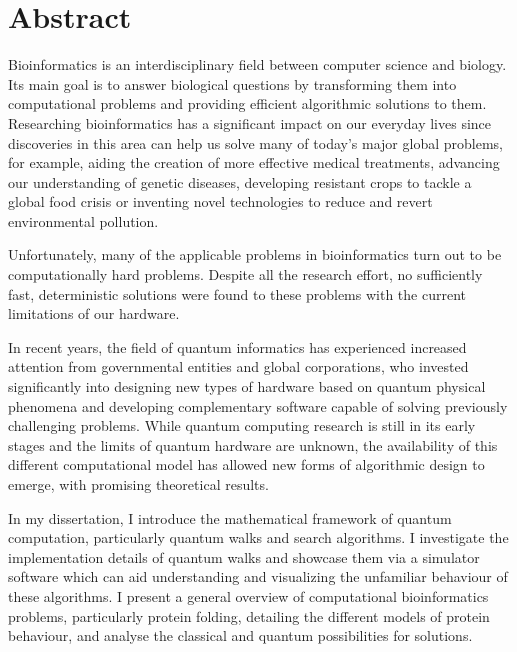 \vfill
\selectenglish


\chapter*{Abstract}

Bioinformatics is an interdisciplinary field between computer science and biology. Its main goal is to answer biological questions by transforming them into computational problems and providing efficient algorithmic solutions to them. Researching bioinformatics has a significant impact on our everyday lives since discoveries in this area can help us solve many of today's major global problems, for example, aiding the creation of more effective medical treatments, advancing our understanding of genetic diseases, developing resistant crops to tackle a global food crisis or inventing novel technologies to reduce and revert environmental pollution.

Unfortunately, many of the applicable problems in bioinformatics turn out to be computationally hard problems. Despite all the research effort, no sufficiently fast, deterministic solutions were found to these problems with the current limitations of our hardware.

In recent years, the field of quantum informatics has experienced increased attention from governmental entities and global corporations, who invested significantly into designing new types of hardware based on quantum physical phenomena and developing complementary software capable of solving previously challenging problems. While quantum computing research is still in its early stages and the limits of quantum hardware are unknown, the availability of this different computational model has allowed new forms of algorithmic design to emerge, with promising theoretical results.

In my dissertation, I introduce the mathematical framework of quantum computation, particularly quantum walks and search algorithms. I investigate the implementation details of quantum walks and showcase them via a simulator software which can aid understanding and visualizing the unfamiliar behaviour of these algorithms. I present a general overview of computational bioinformatics problems, particularly protein folding, detailing the different models of protein behaviour, and analyse the classical and quantum possibilities for solutions.

\vfill
\selectthesislanguage

\setcounter{romanPage}{\value{page}}
